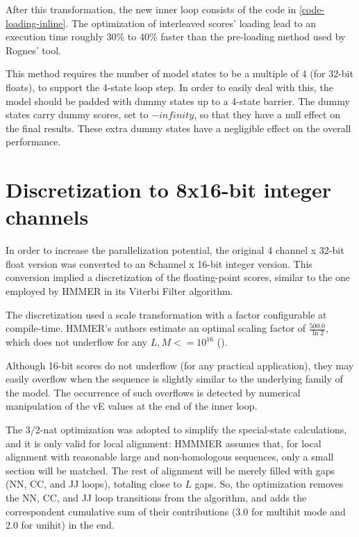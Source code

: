 After this transformation, the new inner loop consists of the code in \cref{code-loading-inline}. The optimization of interleaved scores' loading lead to an execution time roughly 30\% to 40\% faster than the pre-loading method used by Rognes' tool.

This method requires the number of model states to be a multiple of 4 (for 32-bit floats), to support the 4-state loop step. In order to easily deal with this, the model should be padded with dummy states up to a 4-state barrier. The dummy states carry dummy scores, set to $-infinity$, so that they have a null effect on the final results. These extra dummy states have a negligible effect on the overall performance.





\section{Discretization to 8x16-bit integer channels}

In order to increase the parallelization potential, the original 4 channel x 32-bit float version was converted to an 8channel x 16-bit integer version. This conversion implied a discretization of the floating-point scores, similar to the one employed by HMMER in its Viterbi Filter algorithm.

The discretization used a scale transformation with a factor configurable at compile-time. HMMER's authors estimate an optimal scaling factor of $\frac{500.0}{\ln 2}$, which does not underflow for any $L,M <= 10^{16}$ (\cite{hmmer3}).

Although 16-bit scores do not underflow (for any practical application), they may easily overflow when the sequence is slightly similar to the underlying family of the model. The occurrence of such overflows is detected by numerical manipulation of the vE values at the end of the inner loop.


\label {3/2-nat optimization}

The 3/2-nat optimization was adopted to simplify the special-state calculations, and it is only valid for local alignment:
HMMMER assumes that, for local alignment with reasonable large and non-homologous sequences, only a small section will be matched. The rest of alignment will be merely filled with gaps (NN, CC, and JJ loops), totaling close to $L$ gaps. So, the optimization removes the NN, CC, and JJ loop transitions from the algorithm, and adds the correspondent cumulative sum of their contributions (3.0 for multihit mode and 2.0 for unihit) in the end. 

